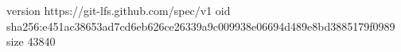 version https://git-lfs.github.com/spec/v1
oid sha256:e451ac38653ad7cd6eb626ce26339a9c009938e06694d489e8bd3885179f0989
size 43840
